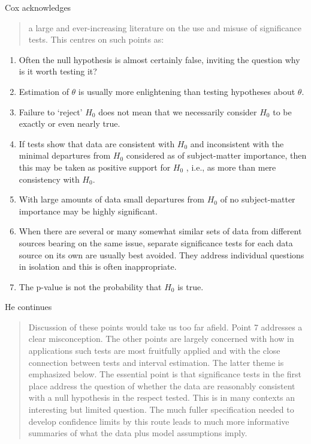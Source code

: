 \documentclass[]{book}
\providecommand{\tightlist}{%
  \setlength{\itemsep}{0pt}\setlength{\parskip}{0pt}}
\begin{document}
Cox acknowledges

\begin{quote}
a large and ever-increasing literature on the use and misuse of significance tests. This centres on such points as:
\end{quote}

\begin{enumerate}
\def\labelenumi{\arabic{enumi}.}
\tightlist
\item
  Often the null hypothesis is almost certainly false, inviting the question why is it worth testing it?\\
\item
  Estimation of \(\theta\) is usually more enlightening than testing hypotheses about \(\theta\).\\
\item
  Failure to `reject' \(H_0\) does not mean that we necessarily consider \(H_0\) to be exactly or even nearly true.\\
\item
  If tests show that data are consistent with \(H_0\) and inconsistent with the minimal departures from \(H_0\) considered as of subject-matter importance, then this may be taken as positive support for \(H_0\) , i.e., as more than mere consistency with \(H_0\).\\
\item
  With large amounts of data small departures from \(H_0\) of no subject-matter importance may be highly significant.\\
\item
  When there are several or many somewhat similar sets of data from different sources bearing on the same issue, separate significance tests for each data source on its own are usually best avoided. They address individual questions in isolation and this is often inappropriate.\\
\item
  The p-value is not the probability that \(H_0\) is true.
\end{enumerate}

He continues

\begin{quote}
Discussion of these points would take us too far afield. Point 7 addresses a clear misconception. The other points are largely concerned with how in applications such tests are most fruitfully applied and with the close connection between tests and interval estimation. The latter theme is emphasized below. The essential point is that significance tests in the first place address the question of whether the data are reasonably consistent with a null hypothesis in the respect tested. This is in many contexts an interesting but limited question. The much fuller specification needed to develop confidence limits by this route leads to much more informative summaries of what the data plus model assumptions imply.
\end{quote}
\end{document}
